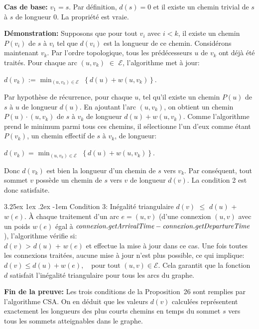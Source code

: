 \documentclass[12pt]{article}
\makeatletter
\renewcommand\paragraph{\@startsection{paragraph}{5}{\z@}%
  {3.25ex \@plus1ex \@minus.2ex}%
  {-1em}%
  {\normalfont\normalsize\bfseries}}
\makeatother
\begin{document}
\textbf{Cas de base:} $v_1 = s$. Par définition, $d(s) = 0$ et il existe un chemin trivial de $s$ à $s$ de longueur 0. La propriété est vraie.

\textbf{Démonstration:} Supposons que pour tout $v_i$ avec $i < k$, il existe un chemin $P(v_i)$ de $s$ à $v_i$ tel que $d(v_i)$ est la longueur de ce 
chemin. Considérons maintenant $v_k$. Par l'ordre topologique, tous les prédécesseurs $u$ de $v_k$ ont déjà été traités. Pour chaque arc $(u, v_k)$ $\in$ $\mathcal{E}$, l'algorithme met à jour:


$d(v_k)$ := $\min_{(u, v_k) \in \mathcal{E}}$ $\left\{ d(u) + w(u, v_k) \right\}$.


Par hypothèse de récurrence, pour chaque $u$, tel qu'il existe un chemin $P(u)$ de $s$ à $u$ de longueur $d(u)$. En ajoutant l'arc $(u, v_k)$, on obtient un chemin
$P(u) \cdot (u, v_k)$ de $s$ à $v_k$ de longueur $d(u) + w(u, v_k)$. Comme l'algorithme prend le minimum parmi tous ces chemins, il sélectionne l'un 
d'eux comme étant $P(v_k)$, un chemin effectif de $s$ à $v_k$, de longueur:

$d(v_k)$ = $\min_{(u, v_k) \in \mathcal{E}}$ $\left\{ d(u) + w(u, v_k) \right\}$.


Donc $d(v_k)$ est bien la longueur d'un chemin de $s$ vers $v_k$. Par conséquent, tout sommet $v$ possède un chemin de $s$ vers $v$ de 
longueur $d(v)$. La condition 2 est donc satisfaite.

\paragraph{Condition 3:}
Inégalité triangulaire $d(v)$ $\leq$ $d(u)$ + $w(e)$.
À chaque traitement d'un arc $e = (u, v)$ (d'une connexion $(u, v)$ avec un poids $w(e)$ égal à $\emph{connexion.getArrivalTime} - \emph{connexion.getDepartureTime}$),
l'algorithme vérifie si:\\
$d(v)$ > $d(u)$ + $w(e)$
et effectue la mise à jour dans ce cas. Une fois toutes les connexions traitées, aucune mise à jour n'est plus possible, ce qui implique:
$d(v) \leq d(u) + w(e),\quad \text{pour tout } (u, v) \in \mathcal{E}$.
Cela garantit que la fonction $d$ satisfait l'inégalité triangulaire pour tous les arcs du graphe.

\textbf{Fin de la preuve:} 
Les trois conditions de la Proposition~26 sont remplies par l'algorithme CSA. On en déduit que les valeurs $d(v)$ 
calculées représentent exactement les longueurs des plus courts chemins en temps du sommet $s$ vers tous les sommets atteignables dans le graphe.
\end{document}
